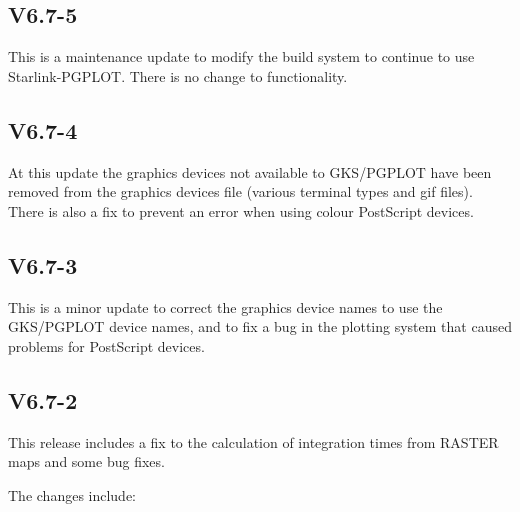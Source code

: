 \documentclass[twoside,11pt]{article}
\renewcommand{\_}{\texttt{\symbol{95}}}
\begin{document}
\subsection{V6.7-5}

This is a maintenance update to modify the build system to continue to use
Starlink-PGPLOT.  There is no change to functionality.

\subsection{V6.7-4}

At this update the graphics devices not available to GKS/PGPLOT have been
removed from the graphics devices file (various terminal types and gif files).
There is also a fix to prevent an error when using colour PostScript devices.

\subsection{V6.7-3}

This is a minor update to correct the graphics device names to use the
GKS/PGPLOT device names, and to fix a bug in the plotting system that caused
problems for PostScript devices.

\subsection{V6.7-2}

This release includes a fix to the calculation of integration times from
RASTER maps and some bug fixes.

The changes include:
\end{document}
